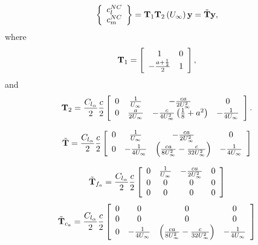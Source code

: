 \begin{equation}
	\left\{ 
	\begin{array}{c}
	c_l^{NC} \\ c_m^{NC}
	\end{array} 
	\right\}=  \bm{\mathbf{T}}_1 \bm{\mathbf{T}}_2 \left( U_\infty \right) \bm{\mathbf{y}} = \tilde{\bm{\mathbf{T}}} \bm{\mathbf{y}},
\end{equation}
where
\begin{equation}
	\bm{\mathbf{T}}_1 = \left[
		\begin{array}{cc}
		 1 & 0 \\
		-\frac{a+\frac{1}{2}}{2} & 1
		\end{array}
		\right],
\end{equation}
and
\begin{equation}
	\bm{\mathbf{T}}_2 = \frac{C_{l_\alpha}}{2} \frac{c}{2}\left[
		\begin{array}{cccc} 
		0 & \frac{1}{U_\infty} & -\frac{c a}{2 U_\infty^2} & 0\\
		0 & \frac{a}{2 U_\infty} & -\frac{c}{4 U_\infty^2}\left( \frac{1}{8} + a^2\right) & -\frac{1}{4U_\infty}
		\end{array}
		\right].
\end{equation}
		
	
\begin{equation}
	\tilde{\bm{\mathbf{T}}} = \frac{C_{l_\alpha}}{2} \frac{c}{2} \left[
		\begin{array}{cccc}
		0 & \frac{1}{U_\infty} & -\frac{c a}{2 U_\infty^2} & 0\\
		0 &
		-\frac{1}{4 U_\infty} &
		\left(  \frac{ c a}{8 U_\infty^2} - \frac{c}{32 U_\infty^2}  \right)& 
		-\frac{1}{4 U_\infty}
		\end{array}	
		\right]
\end{equation}

\begin{equation}
	\tilde{\bm{\mathbf{T}}}_{f_a} = \frac{C_{l_\alpha}}{2} \frac{c}{2} \left[
		\begin{array}{cccc}
		0 & \frac{1}{U_\infty} & -\frac{c a}{2 U_\infty^2} & 0\\
		0 & 0 & 0 & 0\\
		0 & 0 & 0 & 0
		\end{array}
		\right]
\end{equation}
\begin{equation}
	\tilde{\bm{\mathbf{T}}}_{c_a} = \frac{C_{l_\alpha}}{2} \frac{c}{2} \left[
		\begin{array}{cccc}
		0 & 0 & 0 & 0\\
		0 & 0 & 0 & 0\\
		0 &
		-\frac{1}{4 U_\infty} &
		\left(  \frac{ c a}{8 U_\infty^2} - \frac{c}{32 U_\infty^2}  \right)& 
		-\frac{1}{4 U_\infty}
		\end{array}
		\right]
\end{equation}

